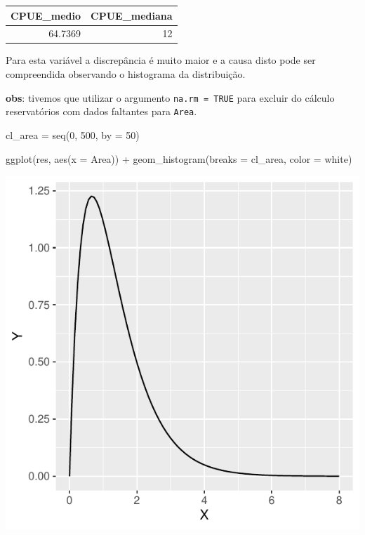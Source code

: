 \documentclass[
]{book}
\newenvironment{Shaded}{\begin{snugshade}}{\end{snugshade}}
\newcommand{\AttributeTok}[1]{\textcolor[rgb]{0.77,0.63,0.00}{#1}}
\newcommand{\DecValTok}[1]{\textcolor[rgb]{0.00,0.00,0.81}{#1}}
\newcommand{\FunctionTok}[1]{\textcolor[rgb]{0.00,0.00,0.00}{#1}}
\newcommand{\NormalTok}[1]{#1}
\newcommand{\OtherTok}[1]{\textcolor[rgb]{0.56,0.35,0.01}{#1}}
\newcommand{\SpecialCharTok}[1]{\textcolor[rgb]{0.00,0.00,0.00}{#1}}
\newcommand{\StringTok}[1]{\textcolor[rgb]{0.31,0.60,0.02}{#1}}
\begin{document}
\begin{tabular}{r|r}
\hline
CPUE\_medio & CPUE\_mediana\\
\hline
64.7369 & 12\\
\hline
\end{tabular}

Para esta variável a discrepância é muito maior e a causa disto pode ser compreendida observando o histograma da distribuição.

\textbf{obs}: tivemos que utilizar o argumento \texttt{na.rm\ =\ TRUE} para excluir do cálculo reservatórios com dados faltantes para \texttt{Area}.

\begin{Shaded}
\begin{Highlighting}[]
\NormalTok{cl\_area }\OtherTok{=} \FunctionTok{seq}\NormalTok{(}\DecValTok{0}\NormalTok{, }\DecValTok{500}\NormalTok{, }\AttributeTok{by =} \DecValTok{50}\NormalTok{)}

\FunctionTok{ggplot}\NormalTok{(res, }\FunctionTok{aes}\NormalTok{(}\AttributeTok{x =}\NormalTok{ Area)) }\SpecialCharTok{+}
  \FunctionTok{geom\_histogram}\NormalTok{(}\AttributeTok{breaks =}\NormalTok{ cl\_area, }\AttributeTok{color =} \StringTok{\textquotesingle{}white\textquotesingle{}}\NormalTok{)}
\end{Highlighting}
\end{Shaded}

\includegraphics{probest-cambientais_files/figure-latex/unnamed-chunk-128-1.pdf}
\end{document}
